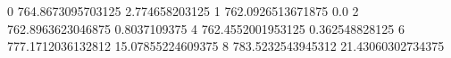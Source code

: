 0 764.8673095703125 2.774658203125
1 762.0926513671875 0.0
2 762.8963623046875 0.8037109375
4 762.4552001953125 0.362548828125
6 777.1712036132812 15.07855224609375
8 783.5232543945312 21.43060302734375
